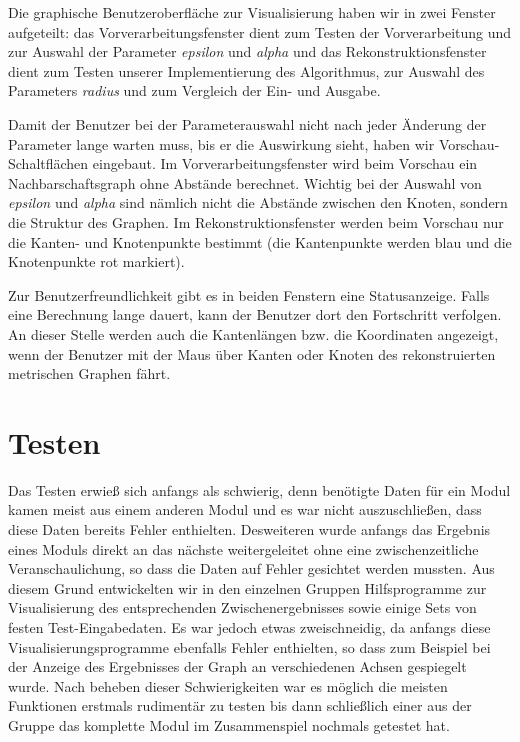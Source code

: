 \documentclass[parskip=half,
 fontsize=12pt, bibtotoc,
 ngerman]
 {article}
\begin{document}
Die graphische Benutzeroberfläche zur Visualisierung haben wir in zwei Fenster aufgeteilt: das Vorverarbeitungsfenster dient zum Testen der Vorverarbeitung und zur Auswahl der Parameter \emph{epsilon} und \emph{alpha} und das Rekonstruktionsfenster dient zum Testen unserer Implementierung des Algorithmus, zur Auswahl des Parameters \emph{radius} und zum Vergleich der Ein- und Ausgabe.

Damit der Benutzer bei der Parameterauswahl nicht nach jeder Änderung der Parameter lange warten muss, bis er die Auswirkung sieht, haben wir Vorschau-Schaltflächen eingebaut. Im Vorverarbeitungsfenster wird beim Vorschau ein Nachbarschaftsgraph ohne Abstände berechnet. Wichtig bei der Auswahl von \emph{epsilon} und \emph{alpha} sind nämlich nicht die Abstände zwischen den Knoten, sondern die Struktur des Graphen. Im Rekonstruktionsfenster werden beim Vorschau nur die Kanten- und Knotenpunkte bestimmt (die Kantenpunkte werden blau und die Knotenpunkte rot markiert).

Zur Benutzerfreundlichkeit gibt es in beiden Fenstern eine Statusanzeige. Falls eine Berechnung lange dauert, kann der Benutzer dort den Fortschritt verfolgen. An dieser Stelle werden auch die Kantenlängen bzw. die Koordinaten angezeigt, wenn der Benutzer mit der Maus über Kanten oder Knoten des rekonstruierten metrischen Graphen fährt.

\section{Testen}

Das Testen erwieß sich anfangs als schwierig, denn benötigte Daten für ein Modul kamen meist aus einem anderen Modul und es war nicht auszuschließen, dass diese Daten bereits Fehler enthielten. Desweiteren wurde anfangs das Ergebnis eines Moduls direkt an das nächste weitergeleitet ohne eine zwischenzeitliche Veranschaulichung, so dass die Daten auf Fehler gesichtet werden mussten. Aus diesem Grund entwickelten wir in den einzelnen Gruppen Hilfsprogramme zur Visualisierung des entsprechenden Zwischenergebnisses sowie einige Sets von festen Test-Eingabedaten. Es war jedoch etwas zweischneidig, da anfangs diese Visualisierungsprogramme ebenfalls Fehler enthielten, so dass zum Beispiel bei der Anzeige des Ergebnisses der Graph an verschiedenen Achsen gespiegelt wurde. Nach beheben dieser Schwierigkeiten war es möglich die meisten Funktionen erstmals rudimentär zu testen bis dann schließlich einer aus der Gruppe das komplette Modul im Zusammenspiel nochmals getestet hat.
\end{document}
